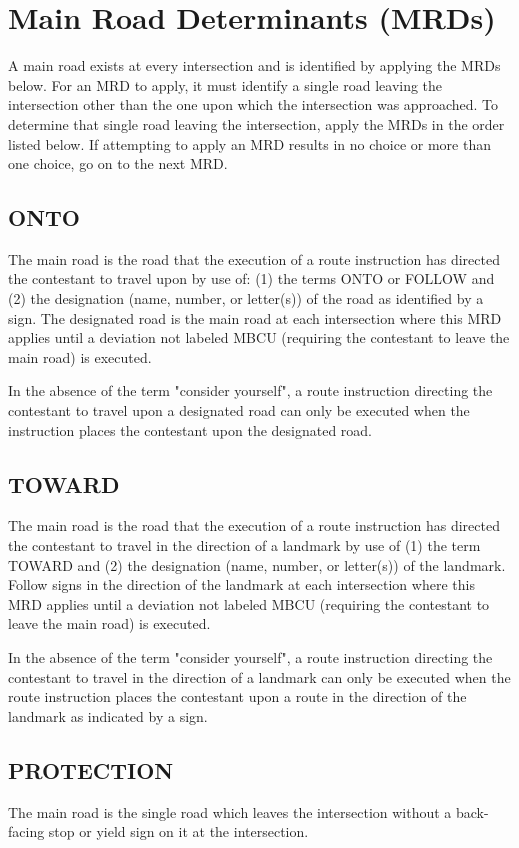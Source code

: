 \section{Main Road Determinants (MRDs)}
\label{sec:mrd} A main road exists at every intersection and is identified by applying the MRDs below.  For an MRD to apply, it must identify a single road leaving the intersection other than the one upon which the intersection was approached.  To determine that single road leaving the intersection, apply the MRDs in the order listed below.  If attempting to apply an MRD results in no choice or more than one choice, go on to the next MRD.

\subsection{ONTO}
\label{sec:onto} The main road is the road that the execution of a route instruction has directed the contestant to travel upon by use of: (1) the terms ONTO or FOLLOW and (2) the designation (name, number, or letter(s)) of the road as identified by a sign.  The designated road is the main road at each intersection where this MRD applies until a deviation not labeled MBCU (requiring the contestant to leave the main road) is executed.

In the absence of the term "consider yourself", a route instruction directing the contestant to travel upon a designated road can only be executed when the instruction places the contestant upon the designated road.

\subsection{TOWARD}
\label{sec:toward} The main road is the road that the execution of a route instruction has directed the contestant to travel in the direction of a landmark by use of (1) the term TOWARD and (2) the designation (name, number, or letter(s)) of the landmark.  Follow signs in the direction of the landmark at each intersection where this MRD applies until a deviation not labeled MBCU (requiring the contestant to leave the main road) is executed.

In the absence of the term "consider yourself", a route instruction directing the contestant to travel in the direction of a landmark can only be executed when the route instruction places the contestant upon a route in the direction of the landmark as indicated by a sign.

\subsection{PROTECTION}
The main road is the single road which leaves the intersection without a back-facing stop or yield sign on it at the intersection.

